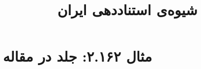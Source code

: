 \documentclass[a4paper,10pt]{article}
\begin{document}
\title{شیوه‌ی استناددهی ایران
 }
\author{}
\date{}
\maketitle



\section*{مثال ۲.۱۶۲: جلد در مقاله}

\cite{حیدری1384}\\
\cite{emlen1997}\\






\end{document}
